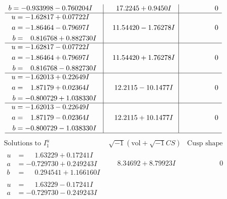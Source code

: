 \documentclass[1p]{elsarticle_modified}
\theoremstyle{definition}
\newcommand{\I}{\sqrt{-1}}
\begin{document}
$$\begin{array}{c|c|c}
\begin{aligned}
b &= -0.933998 - 0.760204 I\end{aligned}
 & \phantom{-}17.2245 + 0.9450 I & \phantom{-0.000000 } 0 \\ \hline\begin{aligned}
u &= -1.62817 + 0.07722 I \\
a &= -1.86464 - 0.79697 I \\
b &= \phantom{-}0.816768 + 0.882730 I\end{aligned}
 & \phantom{-}11.54420 - 1.76278 I & \phantom{-0.000000 } 0 \\ \hline\begin{aligned}
u &= -1.62817 - 0.07722 I \\
a &= -1.86464 + 0.79697 I \\
b &= \phantom{-}0.816768 - 0.882730 I\end{aligned}
 & \phantom{-}11.54420 + 1.76278 I & \phantom{-0.000000 } 0 \\ \hline\begin{aligned}
u &= -1.62013 + 0.22649 I \\
a &= \phantom{-}1.87179 + 0.02364 I \\
b &= -0.800729 + 1.038330 I\end{aligned}
 & \phantom{-}12.2115 - 10.1477 I & \phantom{-0.000000 } 0 \\ \hline\begin{aligned}
u &= -1.62013 - 0.22649 I \\
a &= \phantom{-}1.87179 - 0.02364 I \\
b &= -0.800729 - 1.038330 I\end{aligned}
 & \phantom{-}12.2115 + 10.1477 I & \phantom{-0.000000 } 0\\
 \hline 
 \end{array}$$\newpage$$\begin{array}{c|c|c}  
\text{Solutions to }I^u_{1}& \I (\text{vol} + \sqrt{-1}CS) & \text{Cusp shape}\\
 \hline 
\begin{aligned}
u &= \phantom{-}1.63229 + 0.17241 I \\
a &= -0.729730 + 0.249243 I \\
b &= \phantom{-}0.294541 + 1.166160 I\end{aligned}
 & \phantom{-}8.34692 + 8.79923 I & \phantom{-0.000000 } 0 \\ \hline\begin{aligned}
u &= \phantom{-}1.63229 - 0.17241 I \\
a &= -0.729730 - 0.249243 I \\

\end{aligned}
\end{array}$$
\end{document}
